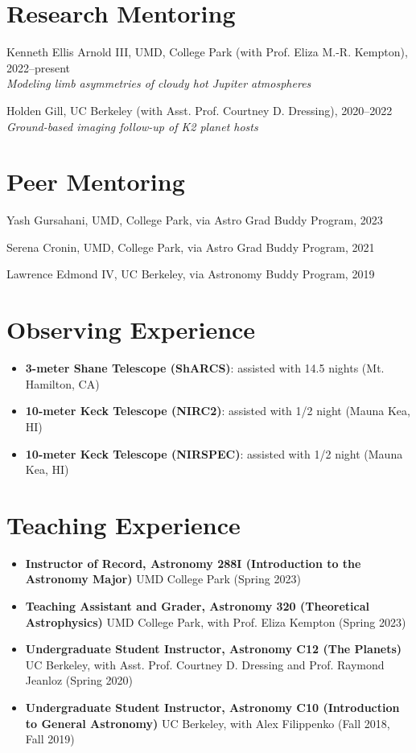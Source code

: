 \documentclass[letterpaper,10.5pt]{article}
\newcommand{\resumeItem}[2]{
  \item\small{
    \textbf{#1}{#2 \vspace{-2pt}}
  }
}
\newcommand{\resumeItemNoBullet}[2]{
  \item[]\small{
    \hspace{-9pt}\textbf{#1}{: #2 \vspace{-6pt}}
  }
}
\newcommand{\resumeSubHeadingListStart}{\begin{itemize}[leftmargin=*]}
\newcommand{\resumeSubHeadingListEnd}{\end{itemize}}
\newcommand{\resumeItemListStart}{\begin{itemize}}
\newcommand{\shorterSection}[1]{\vspace{-10pt}\section{#1}}
\begin{document}
\shorterSection{Research Mentoring}
\small
  \begin{list}{}{\cvlist}  
  \item[{\color{numcolor}}]Kenneth Ellis Arnold III, UMD, College Park (with Prof. Eliza M.-R. Kempton), 2022--present \\
  \textit{Modeling limb asymmetries of cloudy hot Jupiter atmospheres}
  \item[{\color{numcolor}}]Holden Gill, UC Berkeley (with Asst. Prof. Courtney D. Dressing), 2020--2022 \\
    \textit{Ground-based imaging follow-up of K2 planet hosts}


  \end{list}

\shorterSection{Peer Mentoring}
\small
  \begin{list}{}{\cvlist}
  \item[{\color{numcolor}}]Yash Gursahani, UMD, College Park, via Astro Grad Buddy Program, 2023
  \item[{\color{numcolor}}]Serena Cronin, UMD, College Park, via Astro Grad Buddy Program, 2021 
  \item[{\color{numcolor}}]Lawrence Edmond IV, UC Berkeley, via Astronomy Buddy Program, 2019


  \end{list} 



\shorterSection{Observing Experience}
\resumeItemListStart
\resumeItemNoBullet{3-meter Shane Telescope (ShARCS)}{assisted with 14.5 nights (Mt. Hamilton, CA)}
\resumeItemNoBullet{10-meter Keck Telescope (NIRC2)}{assisted with 1/2 night (Mauna Kea, HI)}
\resumeItemNoBullet{10-meter Keck Telescope (NIRSPEC)}{assisted with 1/2 night (Mauna Kea, HI)}

\resumeSubHeadingListEnd

\shorterSection{Teaching Experience}
\resumeItemListStart
\resumeItem{Instructor of Record, Astronomy 288I (Introduction to the Astronomy Major)}{ UMD College Park (Spring 2023)}
\resumeItem{Teaching Assistant and Grader, Astronomy 320 (Theoretical Astrophysics)}{ UMD College Park, with Prof. Eliza Kempton (Spring 2023)}
\resumeItem{Undergraduate Student Instructor, Astronomy C12 (The Planets)}{ UC Berkeley, with Asst. Prof. Courtney D. Dressing and Prof. Raymond Jeanloz (Spring 2020)}
\resumeItem{Undergraduate Student Instructor, Astronomy C10 (Introduction to General Astronomy)}{ UC Berkeley, with Alex Filippenko (Fall 2018, Fall 2019)}
\resumeSubHeadingListEnd
\end{document}
